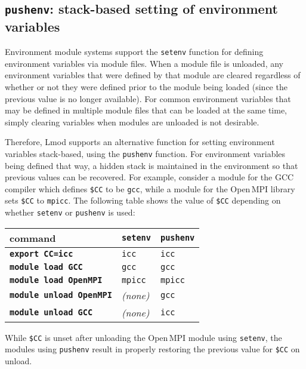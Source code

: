 \subsection{\texttt{\small pushenv}: stack-based setting of environment variables}
\label{sec:lmod_pushenv}

Environment module systems support the \texttt{\small setenv} function for 
defining environment variables via module files. When a module file is unloaded,
any environment variables that were defined by that module are cleared regardless
of whether or not they were defined prior to the module being loaded (since the
previous value is no longer available). For common environment variables that may
be defined in multiple module files that can be loaded at the same time, simply
clearing variables when modules are unloaded is not desirable.

Therefore, Lmod supports an alternative function for setting environment variables
stack-based, using the \texttt{\small pushenv} function. For environment
variables being defined that way, a hidden stack is maintained in the environment
so that previous values can be recovered.
For example, consider a module for the GCC compiler which
defines \texttt{\small \$CC} to be \texttt{\small gcc}, while a module for the
Open\,MPI library sets \texttt{\small \$CC} to
\texttt{\small mpicc}. The following table shows the value of \texttt{\small \$CC}
depending on whether \texttt{\small setenv} or \texttt{\small pushenv} is used:
\begin{center}
 \begin{tabular}{l|l|l}
 command                                 & \texttt{\small setenv} & \texttt{\small pushenv}\\
 \hline
 \textbf{\texttt{\small export CC=icc}}  & \texttt{\small icc}  & \texttt{\small icc} \\
 \textbf{\texttt{\small module load   GCC}}   & \texttt{\small gcc}    & \texttt{\small gcc}  \\
 \textbf{\texttt{\small module load   OpenMPI}} & \texttt{\small mpicc}  & \texttt{\small mpicc} \\
 \textbf{\texttt{\small module unload OpenMPI}} & \emph{(none)}   & \texttt{\small gcc}  \\
 \textbf{\texttt{\small module unload GCC}}   & \emph{(none)}   & \texttt{\small icc} \\
  \hline
    \end{tabular}
\end{center}
\noindent
While \texttt{\small\$CC} is unset after unloading the Open\,MPI module
using \texttt{\small setenv}, the modules using \texttt{\small pushenv} result
in properly restoring the previous value for \texttt{\small\$CC} on unload.

